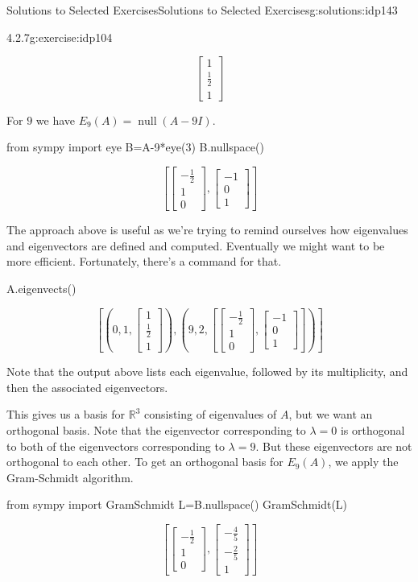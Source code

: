 \documentclass[oneside,10pt,]{book}
\numberwithin{equation}{section}
\newcommand{\bbm}{\begin{bmatrix}}
\newcommand{\ebm}{\end{bmatrix}}
\newcommand{\R}{\mathbb{R}}
\newcommand{\nll}{\operatorname{null}}
\begin{document}
\begin{solutions-chapter}{Solutions to Selected Exercises}{}{Solutions to Selected Exercises}{}{}{g:solutions:idp143}
\begin{inlinesolution}{4.2.7}{}{g:exercise:idp104}
\begin{sageoutput}
\[\bbm 1\\ \frac12\\1\ebm\]
\end{sageoutput}
For \(9\) we have \(E_9(A) = \nll(A-9I)\).%
\begin{sageinput}
from sympy import eye
B=A-9*eye(3)
B.nullspace()
\end{sageinput}
\begin{sageoutput}
\[\left[\bbm -\frac12\\1\\0\ebm, \bbm -1\\0\\1\ebm\right]\]
\end{sageoutput}
The approach above is useful as we're trying to remind ourselves how eigenvalues and eigenvectors are defined and computed. Eventually we might want to be more efficient. Fortunately, there's a command for that.%
\begin{sageinput}
A.eigenvects()
\end{sageinput}
\begin{sageoutput}
\[\left[\left(0,1,\bbm 1\\ \frac12\\1\ebm\right), \left(9,2,\left[\bbm -\frac12\\1\\0\ebm,\bbm -1\\0\\1\ebm\right]\right)\right]\]
\end{sageoutput}
Note that the output above lists each eigenvalue, followed by its multiplicity, and then the associated eigenvectors.%
\par
This gives us a basis for \(\R^3\) consisting of eigenvalues of \(A\), but we want an orthogonal basis. Note that the eigenvector corresponding to \(\lambda = 0\) is orthogonal to both of the eigenvectors corresponding to \(\lambda =9\). But these eigenvectors are not orthogonal to each other. To get an orthogonal basis for \(E_9(A)\), we apply the Gram-Schmidt algorithm.%
\begin{sageinput}
from sympy import GramSchmidt
L=B.nullspace()
GramSchmidt(L)
\end{sageinput}
\begin{sageoutput}
\[\left[\bbm -\frac12\\1\\0\ebm, \bbm -\frac45\\-\frac25\\1\ebm\right]\]
\end{sageoutput}

\end{inlinesolution}
\end{solutions-chapter}
\end{document}
